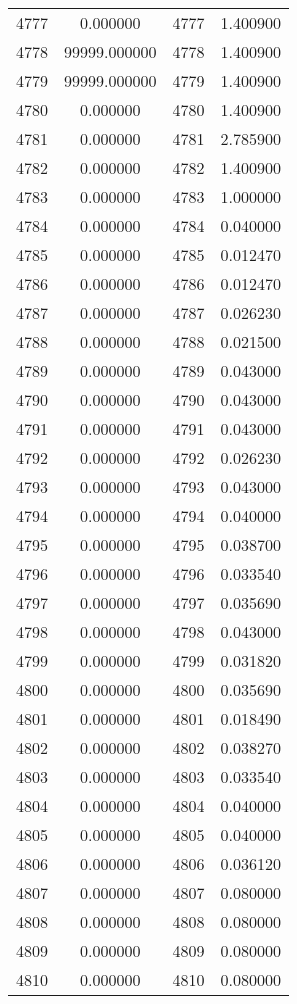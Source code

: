\documentclass[12pt]{article}
\begin{document}
\begin{longtable}{@{}cccc@{}}
4777 & 0.000000 & 4777 & 1.400900 \\
4778 & 99999.000000 & 4778 & 1.400900 \\
4779 & 99999.000000 & 4779 & 1.400900 \\
4780 & 0.000000 & 4780 & 1.400900 \\
4781 & 0.000000 & 4781 & 2.785900 \\
4782 & 0.000000 & 4782 & 1.400900 \\
4783 & 0.000000 & 4783 & 1.000000 \\
4784 & 0.000000 & 4784 & 0.040000 \\
4785 & 0.000000 & 4785 & 0.012470 \\
4786 & 0.000000 & 4786 & 0.012470 \\
4787 & 0.000000 & 4787 & 0.026230 \\
4788 & 0.000000 & 4788 & 0.021500 \\
4789 & 0.000000 & 4789 & 0.043000 \\
4790 & 0.000000 & 4790 & 0.043000 \\
4791 & 0.000000 & 4791 & 0.043000 \\
4792 & 0.000000 & 4792 & 0.026230 \\
4793 & 0.000000 & 4793 & 0.043000 \\
4794 & 0.000000 & 4794 & 0.040000 \\
4795 & 0.000000 & 4795 & 0.038700 \\
4796 & 0.000000 & 4796 & 0.033540 \\
4797 & 0.000000 & 4797 & 0.035690 \\
4798 & 0.000000 & 4798 & 0.043000 \\
4799 & 0.000000 & 4799 & 0.031820 \\
4800 & 0.000000 & 4800 & 0.035690 \\
4801 & 0.000000 & 4801 & 0.018490 \\
4802 & 0.000000 & 4802 & 0.038270 \\
4803 & 0.000000 & 4803 & 0.033540 \\
4804 & 0.000000 & 4804 & 0.040000 \\
4805 & 0.000000 & 4805 & 0.040000 \\
4806 & 0.000000 & 4806 & 0.036120 \\
4807 & 0.000000 & 4807 & 0.080000 \\
4808 & 0.000000 & 4808 & 0.080000 \\
4809 & 0.000000 & 4809 & 0.080000 \\
4810 & 0.000000 & 4810 & 0.080000 \\

\end{longtable}
\end{document}
